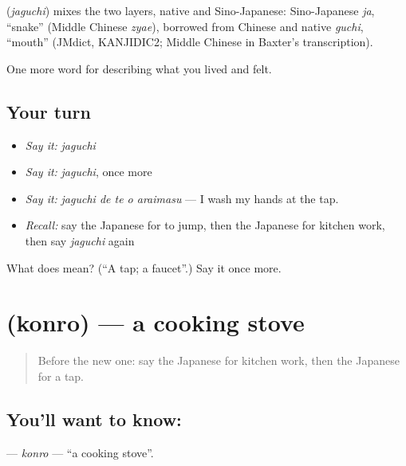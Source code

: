 \begin{cousinweb}
\textbf{} (\emph{jaguchi}) mixes the two layers, native and Sino-Japanese: Sino-Japanese \emph{ja}, \textquotedblleft{}snake\textquotedblright{} (Middle Chinese \emph{zyae}), borrowed from Chinese and native \emph{guchi}, \textquotedblleft{}mouth\textquotedblright{} (JMdict, KANJIDIC2; Middle Chinese in Baxter's transcription).
\end{cousinweb}

\begin{grammarlens}[title={What you've built}]
One more word for describing what you lived and felt.
\end{grammarlens}

\subsection*{Your turn}
\begin{itemize}
\raggedright
  \item \emph{Say it:} \emph{jaguchi}
  \item \emph{Say it:} \emph{jaguchi}, once more
  \item \emph{Say it:} \emph{jaguchi de te o araimasu} — I wash my hands at the tap.
  \item \emph{Recall:} say the Japanese for to jump, then the Japanese for kitchen work, then say \emph{jaguchi} again
\end{itemize}

\begin{tcolorbox}[breakable,colback=teal!4,colframe=teal!35!black,title={Before you move on}]
What does  mean? (\textquotedblleft{}A tap; a faucet\textquotedblright{}.) Say it once more.
\end{tcolorbox}
\section[\texorpdfstring{\ja{こんろ} (konro)}{こんろ (konro)}]{ (konro) — a cooking stove}

\label{lesson:JA-C491-konro}



\begin{quote}
Before the new one: say the Japanese for kitchen work, then the Japanese for a tap.
\end{quote}

\subsection*{You'll want to know: }
\textbf{} — \emph{konro} — \textquotedblleft{}a cooking stove\textquotedblright{}.

